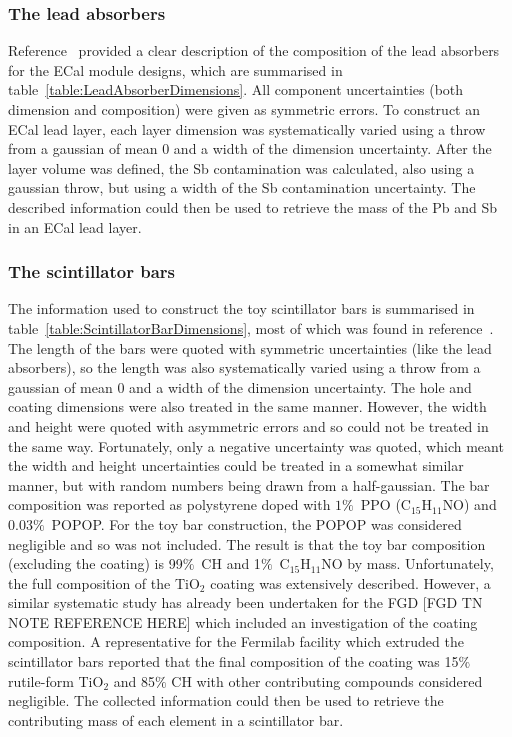 \subsubsection{The lead absorbers}
\label{subsubsec:ECalMassLeadAbsorbers}
Reference~\cite{1748-0221-8-10-P10019} provided a clear description of the composition of the lead absorbers for the ECal module designs, which are summarised in table~\ref{table:LeadAbsorberDimensions}.  All component uncertainties (both dimension and composition) were given as symmetric errors.  To construct an ECal lead layer, each layer dimension was systematically varied using a throw from a gaussian of mean 0 and a width of the dimension uncertainty.  After the layer volume was defined, the Sb contamination was calculated, also using a gaussian throw, but using a width of the Sb contamination uncertainty.  The described information could then be used to retrieve the mass of the Pb and Sb in an ECal lead layer.

\subsubsection{The scintillator bars}
\label{subsubsec:ECalMassSctintillatorBars}
The information used to construct the toy scintillator bars is summarised in table~\ref{table:ScintillatorBarDimensions}, most of which was found in reference~\cite{1748-0221-8-10-P10019}.  The length of the bars were quoted with symmetric uncertainties (like the lead absorbers), so the length was also systematically varied using a throw from a gaussian of mean 0 and a width of the dimension uncertainty.  The hole and coating dimensions were also treated in the same manner.  However, the width and height were quoted with asymmetric errors and so could not be treated in the same way.  Fortunately, only a negative uncertainty was quoted, which meant the width and height uncertainties could be treated in a somewhat similar manner, but with random numbers being drawn from a half-gaussian.  The bar composition was reported as polystyrene doped with $1\%$~PPO (C$_{15}$H$_{11}$NO) and $0.03\%$~POPOP.  For the toy bar construction, the POPOP was considered negligible and so was not included.  The result is that the toy bar composition (excluding the coating) is 99$\%$~CH and 1$\%$~C$_{15}$H$_{11}$NO by mass.  Unfortunately, the full composition of the TiO$_2$ coating was extensively described.  However, a similar systematic study has already been undertaken for the FGD [FGD TN NOTE REFERENCE HERE] which included an investigation of the coating composition.  A representative for the Fermilab facility which extruded the scintillator bars reported that the final composition of the coating was 15$\%$ rutile-form TiO$_2$ and 85$\%$ CH with other contributing compounds considered negligible.  The collected information could then be used to retrieve the contributing mass of each element in a scintillator bar.

